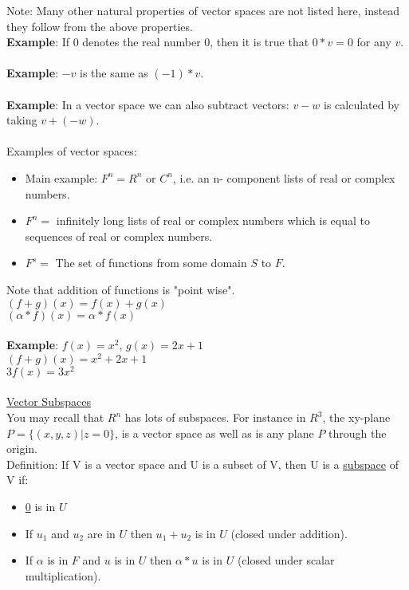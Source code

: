 \documentclass{article}
\begin{document}
Note: Many other natural properties of vector spaces are not listed here, instead they follow from the above properties. \\
\textbf{Example}: If 0 denotes the real number 0, then it is true that $0 * v = 0$ for any $v$.\\ \\
\textbf{Example}: $-v$ is the same as $(-1)*v$. \\ \\
\textbf{Example}: In a vector space we can also subtract vectors: $v - w$ is calculated by taking $v + (-w)$.\\ \\ 

Examples of vector spaces: 
\begin{itemize}
\item Main example: $F^n = R^n$ or $C^n$, i.e. an n- component lists of real or complex numbers. 
\item $F^n =$ infinitely long lists of real or complex numbers which is equal to sequences of real or complex numbers. 
\item $F^s =$ The set of functions from some domain $S$ to $F$. 
\end{itemize}

Note that addition of functions is "point wise". \\ $(f+g)(x) = f(x) + g(x)$ \\
$(\alpha*f)(x) = \alpha * f(x)$\\ \\ 

\textbf{Example}: $f(x) = x^2$, $g(x)= 2x + 1$\\ $(f+g)(x) = x^2 + 2x +1$ \\
$3f(x) = 3x^2$\\ \\

\underline{Vector Subspaces}\\
You may recall that $R^n$ has lots of subspaces. For instance in $R^3$, the xy-plane $P = \{ (x, y, z) | z = 0 \}$, is a vector space as well as is any plane $P$ through the origin. \\

Definition: If V is a vector space and U is a subset of V, then U is a \underline{subspace} of V if:
\begin{itemize}
\item \underline{0} is in $U$
\item If $u_1$ and $u_2$ are in $U$ then $u_1 + u_2$ is in $U$ (closed under addition). 
\item If $\alpha$ is in $F$ and $u$ is in $U$ then $\alpha*u$ is in $U$ (closed under scalar multiplication).

\end{itemize}
\end{document}
